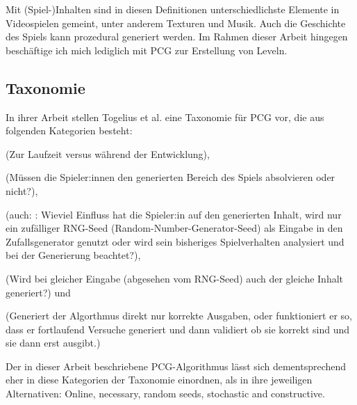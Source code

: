 Mit (Spiel-)Inhalten sind in diesen Definitionen unterschiedlichste Elemente in Videospielen gemeint, unter anderem Texturen und Musik. Auch die Geschichte des Spiels kann prozedural generiert werden. Im Rahmen dieser Arbeit hingegen beschäftige ich mich lediglich mit PCG zur Erstellung von Leveln.

\subsection{Taxonomie}

In ihrer Arbeit \cite{sbpcg} stellen Togelius et al. eine Taxonomie für PCG vor, die aus folgenden Kategorien besteht:

 (Zur Laufzeit versus während der Entwicklung),

 (Müssen die Spieler:innen den generierten Bereich des Spiels absolvieren oder nicht?),

 (auch: : Wieviel Einfluss hat die Spieler:in auf den generierten Inhalt, wird nur ein zufälliger RNG-Seed (Random-Number-Generator-Seed) als Eingabe in den Zufallsgenerator genutzt oder wird sein bisheriges Spielverhalten analysiert und bei der Generierung beachtet?),


 (Wird bei gleicher Eingabe (abgesehen vom RNG-Seed) auch der gleiche Inhalt generiert?) und

 (Generiert der Algorthmus direkt nur korrekte Ausgaben, oder funktioniert er so, dass er fortlaufend Versuche generiert und dann validiert ob sie korrekt sind und sie dann erst ausgibt.) %


Der in dieser Arbeit beschriebene PCG-Algorithmus lässt sich dementsprechend eher in diese Kategorien der Taxonomie einordnen, als in ihre jeweiligen Alternativen: Online, necessary, random seeds,
 stochastic and constructive. %

